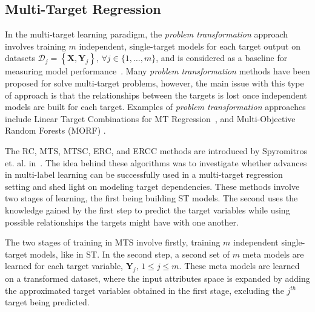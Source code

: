 \documentclass[reqno]{vcuthesis}
\newcommand{\set}[1]{{\left\{#1\right\}}}
\numberwithin{equation}{chapter}
\begin{document}
\subsection{Multi-Target Regression}
In the multi-target learning paradigm, the \textit{problem transformation} approach involves training $m$ independent, single-target models for each target output on datasets $\mathcal{D}_j = \set{\bm X, \bm Y_j},\, \forall j \in \{1, \ldots, m\}$, and is considered as a baseline for measuring model performance~\cite{Spyromitros2014}. Many \textit{problem transformation} methods have been proposed for solve multi-target problems, however, the main issue with this type of approach is that the relationships between the targets is lost once independent models are built for each target. Examples of \textit{problem transformation} approaches include Linear Target Combinations for MT Regression~\cite{Tsoumakas2014}, and Multi-Objective Random Forests (MORF) \cite{Kocev2007}. 

The RC, MTS, MTSC, ERC, and ERCC methods are introduced by Spyromitros et. al. in~\cite{Spyromitros2014}. The idea behind these algorithms was to investigate whether advances in multi-label learning can be successfully used in a multi-target regression setting and shed light on modeling target dependencies. These methods involve two stages of learning, the first being building ST models. The second uses the knowledge gained by the first step to predict the target variables while using possible relationships the targets might have with one another. 

The two stages of training in MTS involve firstly, training $m$ independent single-target models, like in ST. In the second step, a second set of $m$ meta models are learned for each target variable, $\bm{Y}_j,\, 1 \leq j \leq m$. These meta models are learned on a transformed dataset, where the input attributes space is expanded by adding the approximated target variables obtained in the first stage, excluding the $j^{th}$ target being predicted.
\end{document}
